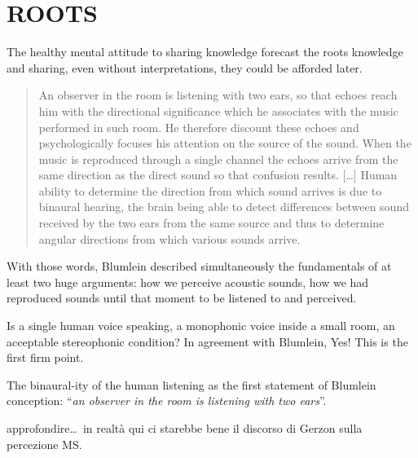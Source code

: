\documentclass{article}
\begin{document}
\vfill\null

\newpage

\section{ROOTS}
\label{sec:roots}

The healthy mental attitude to sharing knowledge forecast the roots knowledge and sharing, even without interpretations, they could be afforded later.

\begin{quotation}
An observer in the room is listening with two ears, so that echoes reach him
with the directional significance which he associates with the music performed
in such room. He therefore discount these echoes and psychologically focuses
his attention on the source of the sound. When the music is reproduced through
a single channel the echoes arrive from the same direction as the direct sound
so that confusion results. [\ldots] Human ability to determine the direction from which sound arrives is due to binaural hearing, the brain being able to detect differences between sound received by the two ears from the same source and thus to determine angular directions from which various sounds arrive. \cite{ab58}
\end{quotation}

With those words, Blumlein \cite{ab58} described simultaneously the fundamentals of at least two huge arguments: how we perceive acoustic sounds, how we had reproduced sounds until that moment to be listened to and perceived.

Is a single human voice speaking, a monophonic voice inside a small room, an acceptable stereophonic condition? In agreement with Blumlein, Yes! This is the first firm point.

The binaural-ity of the human listening as the first statement of Blumlein conception: “\emph{an observer in the room is listening with two ears}”.

\vspace{3cm}

approfondire… in realtà qui ci starebbe bene il discorso di Gerzon sulla percezione MS.

\vfill\null

\newpage

\end{document}
